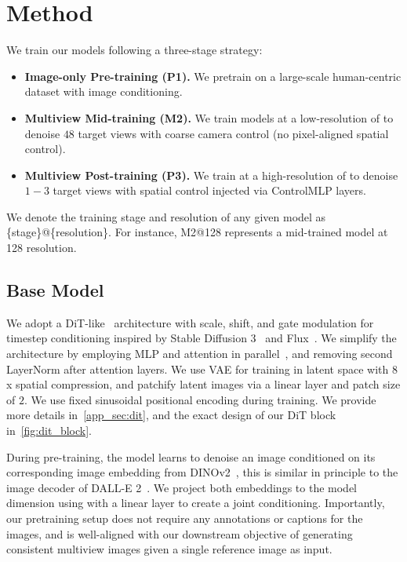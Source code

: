 \section{Method}\label{sec:method}

We train our models following a three-stage strategy:

\begin{itemize}
    \item \textbf{Image-only Pre-training (P1).} We pretrain on a large-scale human-centric dataset with image conditioning.
    \item \textbf{Multiview Mid-training (M2).} We train models at a low-resolution of \resone to denoise $48$ target views with coarse camera control (no pixel-aligned spatial control).
    \item \textbf{Multiview Post-training (P3).} We train at a high-resolution of \resfour to denoise $1-3$ target views with spatial control injected via ControlMLP layers. 
\end{itemize}

\noindent We denote the training stage and resolution of any given model as \{stage\}@\{resolution\}. For instance, M2@128 represents a mid-trained model at 128 resolution.

\subsection{Base Model} \label{ssec:base_model}

 We adopt a DiT-like~\cite{peebles2023scalable} architecture with scale, shift, and gate modulation for timestep 
conditioning inspired by Stable Diffusion 3~\cite{esser2024scaling} and Flux~\cite{flux}.
We simplify the architecture by employing MLP and attention in parallel~\cite{zhai2022scaling}, and removing second LayerNorm after 
attention layers.
We use 
VAE for training in latent space with $8$x spatial compression, and patchify latent images via a linear layer and patch size of $2$. We use fixed sinusoidal positional encoding during training. We provide more details in~\cref{app_sec:dit}, and the exact design of our DiT block in~\cref{fig:dit_block}. 

 During pre-training, the model learns to 
denoise an image conditioned on its corresponding image embedding from 
DINOv2~\cite{darcet2023vitneedreg,oquab2023dinov2},
this is similar in principle to the image decoder of DALL-E 2~\cite{DALLE-2}.
We project both embeddings to the model dimension using with a linear layer 
to create a joint conditioning. Importantly, our pretraining setup does not require any 
annotations or captions for the images, and is well-aligned with our downstream 
objective of generating consistent multiview images given a single reference image as 
input.

